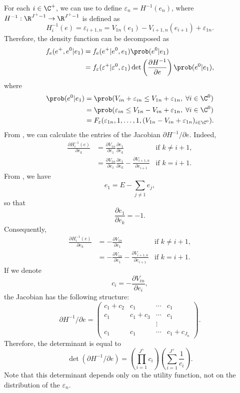 \documentclass[12pt,a4paper]{article}
\begin{document}
For each $i \in \C^+$, we can use 
to define $\varepsilon_n = H^{-1}(e_n)$, where $H^{-1}:\R^{J^+-1}\to\R^{J^+-1}$ is defined as
\begin{equation}
  \label{eq:change_variable}
H_i^{-1}(e) = \varepsilon_{i+1,n}   =   V_{1n}(e_1) - V_{i+1,n}(e_{i+1}) + \varepsilon_{1n}.
\end{equation}
Therefore, the density function can be decomposed as
\begin{align*}
  f_e(e^+, e^0 | e_1) &= f_e(e^+ | e^0, e_1) \prob(e^0 |e_1) \\
                     &= f_\varepsilon(\varepsilon^+ | \varepsilon^0, \varepsilon_1) \det \left( \frac{\partial H^{-1}}{\partial e}\right)  \prob(e^0 |e_1),
\end{align*}
where
\begin{align*}
  \prob(e^0 |e_1) &= \prob(V_{in} + \varepsilon_{in}  \leq V_{1n} + \varepsilon_{1n},\; \forall i\in\C^0) \\
  &= \prob(\varepsilon_{in}  \leq V_{1n} -V_{in} + \varepsilon_{1n},\; \forall i\in\C^0) \\
  &= F_\varepsilon(\varepsilon_{1n}, 1, \ldots, 1, (V_{1n} -V_{in} + \varepsilon_{1n})_{i\in \C^0}).
\end{align*}
From , we can calculate the entries of the Jacobian $\partial H^{-1}/\partial e$. Indeed,
\begin{align*}
  \frac{\partial H_i^{-1}(e)}{\partial e_k} &= \frac{\partial V_{1n}}{\partial e_1}\frac{\partial e_1}{\partial e_k}  & \text{if } k \neq i+1, \\
  &= \frac{\partial V_{1n}}{\partial e_1}\frac{\partial e_1}{\partial e_k} - \frac{\partial V_{i+1,n}}{\partial e_{i+1}}& \text{if } k = i+1.
\end{align*}
From , we have
\[
e_1 = E - \sum_{j\neq 1} e_j,
\]
so that
\[
\frac{\partial e_1}{\partial e_k} = -1.
\]
Consequently,
\begin{align*}
  \frac{\partial H_i^{-1}(e)}{\partial e_k} &= -\frac{\partial V_{1n}}{\partial e_1}  & \text{if } k \neq i+1, \\
  &= -\frac{\partial V_{1n}}{\partial e_1} - \frac{\partial V_{i+1,n}}{\partial e_{i+1}}& \text{if } k = i+1.
\end{align*}
If we denote
\begin{equation}
c_i =  - \frac{\partial V_{in}}{\partial e_{i}},
\end{equation}
the Jacobian has the following structure:
\[
\partial H^{-1}/\partial e= \left(
\begin{array}{cccc}
  c_1 + c_2 & c_1 & \cdots & c_1 \\
  c_1      & c_1 + c_3 & \cdots & c_1 \\
  &          &   \vdots    \\
  c_1    &  c_1 & \cdots & c_1 + c_{J_n}
\end{array}
\right).
\]
Therefore, the determinant is equal to
\[
\det(\partial H^{-1}/\partial e) = \left(\prod_{i=1}^{J^+} c_i\right)\left(\sum_{i=1}^{J^+}\frac{1}{c_i}\right).
\]
Note that this determinant depends only on the utility function, not on the distribution of the $\varepsilon_n$.
\end{document}
